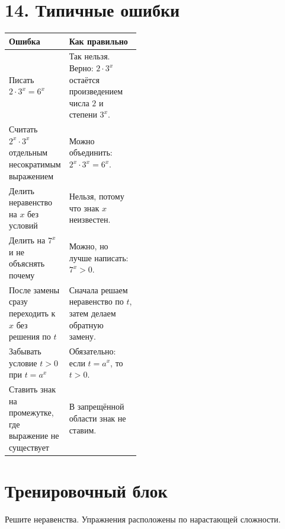 \documentclass[a4paper,12pt]{article}
\newcommand{\sectionline}{\vspace{2mm}{\color{linegray}\hrule height 0.5pt}\vspace{2mm}}
\begin{document}
\sectionline

\section*{\textcolor{darkaccent}{14. Типичные ошибки}}

\begin{center}
\renewcommand{\arraystretch}{1.45}
\begin{tabularx}{\linewidth}{@{}p{0.44\linewidth}X@{}}
\toprule
Ошибка & Как правильно \\
\midrule
Писать $2\cdot3^x=6^x$ &
Так нельзя. Верно: $2\cdot3^x$ остаётся произведением числа $2$ и степени $3^x$. \\

Считать $2^x\cdot3^x$ отдельным несократимым выражением &
Можно объединить: $2^x\cdot3^x=6^x$. \\

Делить неравенство на $x$ без условий &
Нельзя, потому что знак $x$ неизвестен. \\

Делить на $7^x$ и не объяснять почему &
Можно, но лучше написать: $7^x>0$. \\

После замены сразу переходить к $x$ без решения по $t$ &
Сначала решаем неравенство по $t$, затем делаем обратную замену. \\

Забывать условие $t>0$ при $t=a^x$ &
Обязательно: если $t=a^x$, то $t>0$. \\

Ставить знак на промежутке, где выражение не существует &
В запрещённой области знак не ставим. \\
\bottomrule
\end{tabularx}
\end{center}

\newpage

\section*{\textcolor{darkaccent}{Тренировочный блок}}

Решите неравенства. Упражнения расположены по нарастающей сложности.
\end{document}

